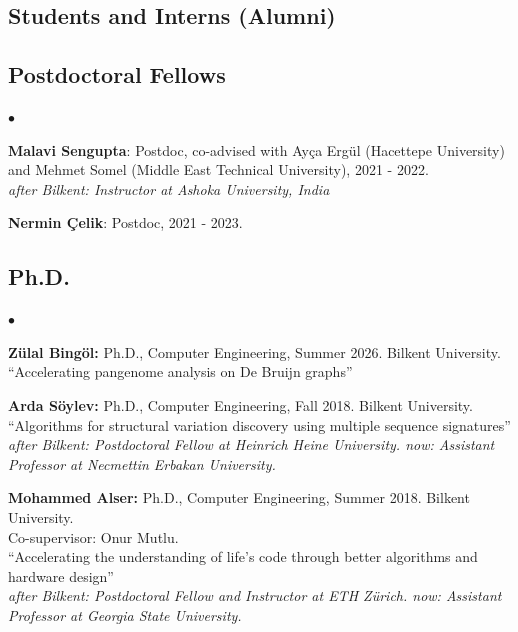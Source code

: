 \documentclass[margin,line]{res}
\newenvironment{list2}{
  \begin{list}{$\bullet$}{%
      \setlength{\itemsep}{0.1cm}
      \setlength{\parsep}{0in} \setlength{\parskip}{0in}
      \setlength{\topsep}{0in} \setlength{\partopsep}{0in} 
      \setlength{\leftmargin}{0.2in}}}{\end{list}}
\begin{document}
\begin{resume}
\section{\sc Students and Interns (Alumni)}
\vspace*{-.4cm}

\subsection{\small \sc Postdoctoral Fellows}
\begin{list2}
\item 
{\bf Malavi Sengupta}: Postdoc, co-advised with Ayça Ergül (Hacettepe University) and Mehmet Somel (Middle East Technical University), 2021 - 2022.\\
\textit{after Bilkent: Instructor at Ashoka University,  India}
\item 
{\bf Nermin Çelik}: Postdoc, 2021 - 2023.
\end{list2}

\clearpage
\vspace*{-.4cm}

\subsection{\small \sc Ph.D.}
\begin{list2}
  \item
  {\bf Zülal Bingöl:} Ph.D., Computer Engineering, Summer 2026. Bilkent University.\\
  ``Accelerating pangenome analysis on De Bruijn graphs''
\item
  {\bf Arda Söylev:} Ph.D., Computer Engineering, Fall 2018.
  Bilkent University. \\
  ``Algorithms for structural variation discovery using multiple sequence signatures''\\
    {\it after Bilkent: Postdoctoral Fellow at Heinrich Heine University. now: Assistant Professor at Necmettin Erbakan University.}


\item
  {\bf Mohammed Alser:} Ph.D., Computer Engineering, Summer 2018.
  Bilkent University.\\ Co-supervisor: Onur Mutlu.\\
  ``Accelerating the understanding of life’s code through better algorithms and hardware design''\\
  {\it after Bilkent: Postdoctoral Fellow and Instructor at ETH Zürich. now: Assistant Professor at Georgia State University.}
\end{list2}


\end{resume}
\end{document}
